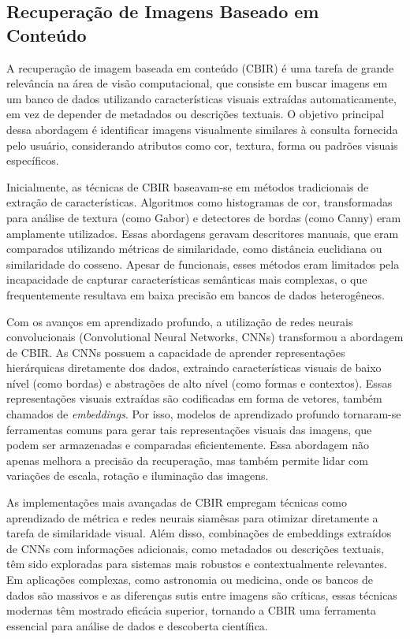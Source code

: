 \subsection{Recuperação de Imagens Baseado em Conteúdo}
\label{sec:cbir}

A recuperação de imagem baseada em conteúdo (CBIR) é uma tarefa de grande relevância na área de visão computacional, que consiste em buscar imagens em um banco de dados utilizando características visuais extraídas automaticamente, em vez de depender de metadados ou descrições textuais. O objetivo principal dessa abordagem é identificar imagens visualmente similares à consulta fornecida pelo usuário, considerando atributos como cor, textura, forma ou padrões visuais específicos.

Inicialmente, as técnicas de CBIR baseavam-se em métodos tradicionais de extração de características. Algoritmos como histogramas de cor, transformadas para análise de textura (como Gabor) e detectores de bordas (como Canny) eram amplamente utilizados. Essas abordagens geravam descritores manuais, que eram comparados utilizando métricas de similaridade, como distância euclidiana ou similaridade do cosseno. Apesar de funcionais, esses métodos eram limitados pela incapacidade de capturar características semânticas mais complexas, o que frequentemente resultava em baixa precisão em bancos de dados heterogêneos.

Com os avanços em aprendizado profundo, a utilização de redes neurais convolucionais (Convolutional Neural Networks, CNNs) transformou a abordagem de CBIR. As CNNs possuem a capacidade de aprender representações hierárquicas diretamente dos dados, extraindo características visuais de baixo nível (como bordas) e abstrações de alto nível (como formas e contextos). Essas representações visuais extraídas são codificadas em forma de vetores, também chamados de \emph{embeddings}. Por isso, modelos de aprendizado profundo tornaram-se ferramentas comuns para gerar tais representações visuais das imagens, que podem ser armazenadas e comparadas eficientemente. Essa abordagem não apenas melhora a precisão da recuperação, mas também permite lidar com variações de escala, rotação e iluminação das imagens.

As implementações mais avançadas de CBIR empregam técnicas como aprendizado de métrica e redes neurais siamêsas para otimizar diretamente a tarefa de similaridade visual. Além disso, combinações de embeddings extraídos de CNNs com informações adicionais, como metadados ou descrições textuais, têm sido exploradas para sistemas mais robustos e contextualmente relevantes. Em aplicações complexas, como astronomia ou medicina, onde os bancos de dados são massivos e as diferenças sutis entre imagens são críticas, essas técnicas modernas têm mostrado eficácia superior, tornando a CBIR uma ferramenta essencial para análise de dados e descoberta científica.

